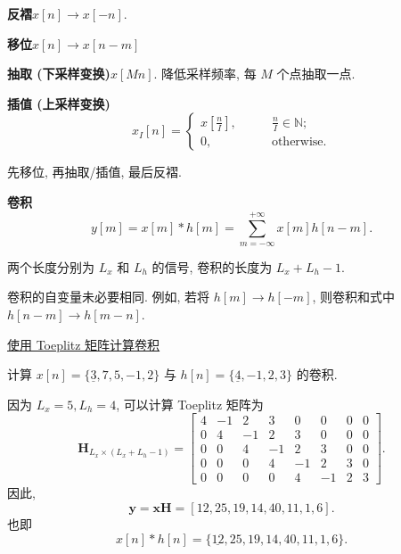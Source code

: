 \textbf{反褶}\quad $x[n]\rightarrow x[-n]$.

\textbf{移位}\quad $x[n]\rightarrow x[n-m]$

\textbf{抽取 (下采样变换)}\quad $x[Mn]$. 降低采样频率, 每 $M$ 个点抽取一点.

\textbf{插值 (上采样变换)}
\begin{equation}
    x_I[n]=\begin{cases}
        x\left[\frac{n}{I}\right], & \qquad \frac{n}{I}\in\mathbb{N}; \\
        0,                         & \qquad \text{otherwise}.
    \end{cases}
\end{equation}

先移位, 再抽取/插值, 最后反褶.

\textbf{卷积}
\begin{equation}
    y[m]=x[m]*h[m]=\sum_{m=-\infty}^{+\infty}x[m]h[n-m].
\end{equation}

两个长度分别为 $L_x$ 和 $L_h$ 的信号, 卷积的长度为 $L_x+L_h-1$.

卷积的自变量未必要相同. 例如, 若将 $h[m]\rightarrow h[-m]$, 则卷积和式中 $h[n-m]\rightarrow h[m-n]$.

\underline{使用 Toeplitz 矩阵计算卷积}
\begin{exampleprob}
    计算 $x[n]=\{\underline{3},7,5,-1,2\}$ 与 $h[n]=\{\underline{4},-1,2,3\}$ 的卷积.

    \begin{solution}
        因为 $L_x=5,L_h=4$, 可以计算 Toeplitz 矩阵为
        \begin{equation}
            \bm{H}_{L_x\times(L_x+L_h-1)}=\begin{bmatrix}
                4 & -1 & 2  & 3  & 0  & 0  & 0 & 0 \\
                0 & 4  & -1 & 2  & 3  & 0  & 0 & 0 \\
                0 & 0  & 4  & -1 & 2  & 3  & 0 & 0 \\
                0 & 0  & 0  & 4  & -1 & 2  & 3 & 0 \\
                0 & 0  & 0  & 0  & 4  & -1 & 2 & 3
            \end{bmatrix}.
        \end{equation}
        因此,
        \begin{equation}
            \bm{y}=\bm{xH}=[12,25,19,14,40,11,1,6].
        \end{equation}
        也即
        \begin{equation}
            x[n]*h[n]=\{\underline{12},25,19,14,40,11,1,6\}.
        \end{equation}
    \end{solution}
\end{exampleprob}

